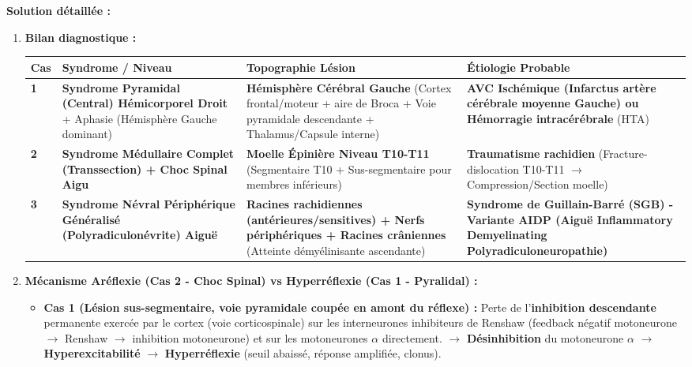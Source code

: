 \documentclass[11pt]{article}
\begin{document}
\begin{exoresolu}
\tcblower
\textbf{Solution détaillée :}
\begin{enumerate}
    \item \textbf{Bilan diagnostique :}
    \begin{center}
    \begin{tabularx}{\linewidth}{|l|X|X|X|}\hline
    \rowcolor{popblueL} \textbf{Cas} & \textbf{Syndrome / Niveau} & \textbf{Topographie Lésion} & \textbf{Étiologie Probable} \\ \hline
    \textbf{1} & \textbf{Syndrome Pyramidal (Central) Hémicorporel Droit} + Aphasie (Hémisphère Gauche dominant) & \textbf{Hémisphère Cérébral Gauche} (Cortex frontal/moteur + aire de Broca + Voie pyramidale descendante + Thalamus/Capsule interne) & \textbf{AVC Ischémique (Infarctus artère cérébrale moyenne Gauche) ou Hémorragie intracérébrale} (HTA) \\ \hline
    \textbf{2} & \textbf{Syndrome Médullaire Complet (Transsection) + Choc Spinal Aigu} & \textbf{Moelle Épinière Niveau T10-T11} (Segmentaire T10 + Sus-segmentaire pour membres inférieurs) & \textbf{Traumatisme rachidien} (Fracture-dislocation T10-T11 $\rightarrow$ Compression/Section moelle) \\ \hline
    \textbf{3} & \textbf{Syndrome Névral Périphérique Généralisé (Polyradiculonévrite) Aiguë} & \textbf{Racines rachidiennes (antérieures/sensitives) + Nerfs périphériques + Racines crâniennes} (Atteinte démyélinisante ascendante) & \textbf{Syndrome de Guillain-Barré (SGB) - Variante AIDP (Aiguë Inflammatory Demyelinating Polyradiculoneuropathie)} \\ \hline
    \end{tabularx}
    \end{center}
    \item \textbf{Mécanisme Aréflexie (Cas 2 - Choc Spinal) vs Hyperréflexie (Cas 1 - Pyralidal) :}
    \begin{itemize}
        \item \textbf{Cas 1 (Lésion sus-segmentaire, voie pyramidale coupée en amont du réflexe) :} Perte de l'\textbf{inhibition descendante} permanente exercée par le cortex (voie corticospinale) sur les interneurones inhibiteurs de Renshaw (feedback négatif motoneurone $\rightarrow$ Renshaw $\rightarrow$ inhibition motoneurone) et sur les motoneurones $\alpha$ directement. $\rightarrow$ \textbf{Désinhibition} du motoneurone $\alpha$ $\rightarrow$ \textbf{Hyperexcitabilité} $\rightarrow$ \textbf{Hyperréflexie} (seuil abaissé, réponse amplifiée, clonus).

\end{itemize}
\end{enumerate}
\end{exoresolu}
\end{document}
